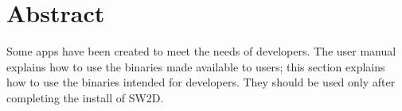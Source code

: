 \section{Abstract}
Some apps have been created to meet the needs of developers. The user manual explains how to use the binaries made available to users; this section explains how to use the binaries intended for developers. They should be used only after completing the install of SW2D.

%
%
%
